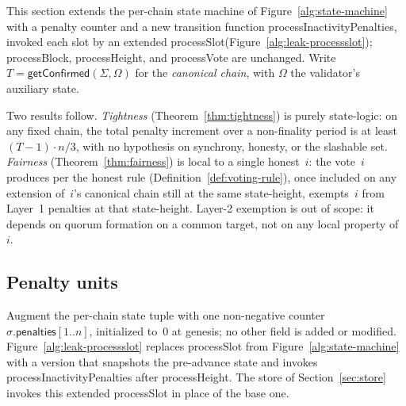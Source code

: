 \documentclass{article}
\newcommand{\penalties}{\mathsf{penalties}}
\newcommand{\processSlot}{\textsf{processSlot}\xspace}
\newcommand{\processBlock}{\textsf{processBlock}\xspace}
\newcommand{\processHeight}{\textsf{processHeight}\xspace}
\newcommand{\processVote}{\textsf{processVote}\xspace}
\newcommand{\processInactivityPenalties}{\textsf{processInactivityPenalties}\xspace}
\newcommand{\getConfirmed}{\textsf{getConfirmed}\xspace}
\theoremstyle{plain}
\theoremstyle{definition}
\theoremstyle{remark}
\begin{document}
This section extends the per-chain state machine of Figure~\ref{alg:state-machine} with a penalty counter and a new transition function \processInactivityPenalties, invoked each slot by an extended \processSlot (Figure~\ref{alg:leak-processslot}); \processBlock, \processHeight, and \processVote are unchanged.
Write $T = \getConfirmed(\Sigma, \Omega)$ for the \emph{canonical chain}, with $\Omega$ the validator's auxiliary state.

Two results follow.
\emph{Tightness} (Theorem~\ref{thm:tightness}) is purely state-logic: on any fixed chain, the total penalty increment over a non-finality period is at least $(T-1) \cdot n/3$, with no hypothesis on synchrony, honesty, or the slashable set.
\emph{Fairness} (Theorem~\ref{thm:fairness}) is local to a single honest~$i$: the vote~$i$ produces per the honest rule (Definition~\ref{def:voting-rule}), once included on any extension of~$i$'s canonical chain still at the same state-height, exempts~$i$ from Layer~1 penalties at that state-height.
Layer-2 exemption is out of scope: it depends on quorum formation on a common target, not on any local property of~$i$.

\subsection{Penalty units}

Augment the per-chain state tuple with one non-negative counter $\sigma.\penalties[1..n]$, initialized to~$0$ at genesis; no other field is added or modified.
Figure~\ref{alg:leak-processslot} replaces \processSlot from Figure~\ref{alg:state-machine} with a version that snapshots the pre-advance state and invokes \processInactivityPenalties after \processHeight.
The store of Section~\ref{sec:store} invokes this extended \processSlot in place of the base one.
\end{document}
